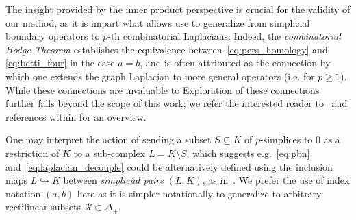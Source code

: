 The insight provided by the inner product perspective is crucial for the validity of our method, as it is impart what allows use to generalize from simplicial boundary operators to $p$-th combinatorial Laplacians. 
Indeed, the \emph{combinatorial Hodge Theorem} establishes the equivalence between~\eqref{eq:pers_homology} and  \eqref{eq:betti_four} in the case $a = b$, and is often attributed as the connection by which one extends the graph Laplacian to more general operators (i.e. for $p \geq 1$).
While these connections are invaluable to Exploration of these connections further falls beyond the scope of this work; we refer the interested reader to~\cite{memoli2022persistent} and references within for an overview. 




\begin{remark}
One may interpret the action of sending a subset $S \subseteq K$ of $p$-simplices to $0$ as a restriction of $K$ to a sub-complex $L = K \setminus S$, which suggests e.g.~\eqref{eq:pbn} and~\eqref{eq:laplacian_decouple} could be alternatively defined using the inclusion maps $L \hookrightarrow K$ between \emph{simplicial pairs} $(L, K)$, as in~\cite{memoli2022persistent}. 
We prefer the use of index notation $(a,b)$ here as it is simpler notationally to generalize to arbitrary rectilinear subsets $\mathcal{R} \subset \Delta_+$.
\end{remark}

